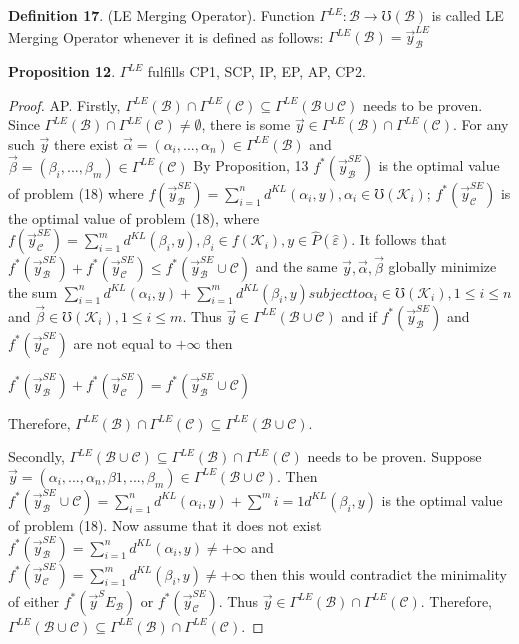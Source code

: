\documentclass[]{iosart2c}
\begin{document}
  \textbf{Definition 17}. (LE Merging Operator). Function
  $\Gamma^{LE} : \mathcal{B} \to \mho(\mathcal{B})$ is called LE Merging Operator
  whenever it is defined as follows: $\Gamma^{LE}(\mathcal{B}) = \vec{y}^{LE}_\mathcal{B}$

  \textbf{Proposition 12}. $\Gamma^{LE}$ fulfills CP1, SCP, IP, EP, AP, CP2.

  \begin{proof}
    AP. Firstly, $\Gamma^{LE}(\mathcal{B}) \cap \Gamma^{LE}(\mathcal{C}) \subseteq \Gamma^{LE}(\mathcal{B} \cup \mathcal{C})$
    needs to be proven. Since $\Gamma^{LE}(\mathcal{B}) \cap \Gamma^{LE}(\mathcal{C}) \neq \emptyset$,
    there is some $\vec{y} \in \Gamma^{LE}(\mathcal{B}) \cap \Gamma^{LE}(\mathcal{C})$. For any
    such $\vec{y}$ there exist $\vec{\alpha} = (\alpha_i, ... , \alpha_n) \in \Gamma^{LE}(\mathcal{B})$
    and $\vec{\beta} = (\beta_i, ... , \beta_m) \in \Gamma^{LE}(\mathcal{C})$ By Proposition,
    13 $f^*(\vec{y}^{SE}_\mathcal{B} )$ is the optimal value of problem
    (18) where $f (\vec{y}^{SE}_\mathcal{B} ) = \sum^n_{i=1} d^{KL}(\alpha_i, y), \alpha_i \in \mho(\mathcal{K}_i)$;
    $f^*(\vec{y}^{SE}_\mathcal{C} )$ is the optimal value of problem (18),
    where $f (\vec{y}^{SE}_\mathcal{C} ) = \sum^m_{i=1} d^{KL}(\beta_i, y), \beta_i \in f(\mathcal{K}_i), y \in
    \widehat{P}(\hat{\varepsilon})$. It follows that $f^*(\vec{y}^{SE}_\mathcal{B} ) + f^*(\vec{y}^{SE}_\mathcal{C} ) \leq f^*(\vec{y}^{SE}_\mathcal{B}\cup\mathcal{C})$
    and the same $\vec{y}, \vec{\alpha}, \vec{\beta}$ globally minimize the sum $\sum^n_{i=1} d^{KL}(\alpha_i, y) +\sum^m_{i=1} d^{KL}(\beta_i, y) subject to \alpha_i \in
    \mho(\mathcal{K}_i), 1 \leq i \leq n$ and $\vec{\beta} \in \mho(\mathcal{K}_i), 1 \leq i \leq m$. Thus
    $\vec{y} \in \Gamma^{LE}(\mathcal{B} \cup \mathcal{C})$ and if $f^*(\vec{y}^{SE}_\mathcal{B} )$ and $f^*(\vec{y}^{SE}_\mathcal{C} )$ are not
    equal to $+\infty$ then

    $f^*(\vec{y}^{SE}_\mathcal{B} ) + f^*(\vec{y}^{SE}_\mathcal{C} ) = f^*(\vec{y}^{SE}_\mathcal{B}\cup\mathcal{C})$

    Therefore, $\Gamma^{LE}(\mathcal{B}) \cap \Gamma^{LE}(\mathcal{C}) \subseteq \Gamma^{LE}(\mathcal{B} \cup \mathcal{C})$.

    Secondly, $\Gamma^{LE}(\mathcal{B} \cup \mathcal{C}) \subseteq \Gamma^{LE}(\mathcal{B}) \cap \Gamma^{LE}(\mathcal{C})$ needs
    to be proven. Suppose $\vec{y} = (\alpha_i, ... , \alpha_n, \beta1, ... , \beta_m)
    \in \Gamma^{LE}(\mathcal{B} \cup \mathcal{C})$.
    Then $f^*(\vec{y}^{SE}_\mathcal{B} \cup\mathcal{C}) = \sum^n_{i=1} d^{KL}(\alpha_i, y) + \sum^m{i=1} d^{KL}(\beta_i, y)$ is the optimal value of problem (18).
    Now assume that it does not exist $f^*(\vec{y}^{SE}_\mathcal{B} ) = \sum^n_{i=1} d^{KL}(\alpha_i, y) \neq +\infty$ and $f^*(\vec{y}^{SE}_\mathcal{C} ) = \sum^m_{i=1}
    d^{KL}(\beta_i, y) \neq +\infty$ then this would contradict
    the minimality of either $f^*(\vec{y}^SE_\mathcal{B})$ or
    $f^*(\vec{y}^{SE}_\mathcal{C} )$. Thus $\vec{y} \in \Gamma^{LE}(\mathcal{B}) \cap \Gamma^{LE}(\mathcal{C})$. Therefore,
    $\Gamma^{LE}(\mathcal{B} \cup \mathcal{C}) \subseteq \Gamma^{LE}(\mathcal{B}) \cap \Gamma^{LE}(\mathcal{C})$.
  \end{proof}
\end{document}
